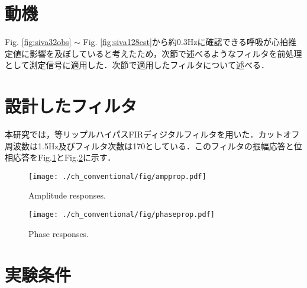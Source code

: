 {%
\section{動機}
\label{sec:conv:motivation}
Fig. \ref{fig:siva32obs} $\sim$ Fig. \ref{fig:siva128est}から約0.3Hzに確認できる呼吸が心拍推定値に影響を及ぼしていると考えたため，次節で述べるようなフィルタを前処理として測定信号に適用した．次節で適用したフィルタについて述べる．

\section{設計したフィルタ}
\label{sec:conv:filteroutline}
本研究では，等リップルハイパスFIRディジタルフィルタを用いた．カットオフ周波数は1.5Hz及びフィルタ次数は170としている．このフィルタの振幅応答と位相応答をFig.\ref{fig:ampres}とFig.\ref{fig:phaseres}に示す．

\begin{figure}[!t]
\centering
\texttt{[image: ./ch\_conventional/fig/ampprop.pdf]}
\caption{Amplitude responses.}
\label{fig:ampres}
\end{figure}

\begin{figure}[!t]
\centering
\texttt{[image: ./ch\_conventional/fig/phaseprop.pdf]}
\caption{Phase responses.}
\label{fig:phaseres}
\end{figure}

\section{実験条件}
\label{sec:conv:expcond5}

}
